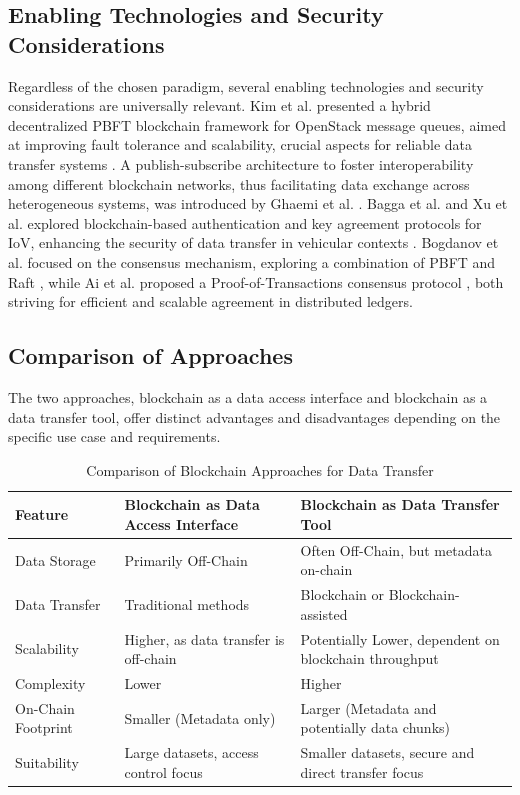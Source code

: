 \documentclass[10pt]{llncs}
\begin{document}
\subsection{Enabling Technologies and Security Considerations}

Regardless of the chosen paradigm, several enabling technologies and security considerations are universally relevant. 
Kim et al. presented a hybrid decentralized PBFT blockchain framework for OpenStack message queues, aimed at improving fault tolerance and scalability, 
crucial aspects for reliable data transfer systems \cite{kim2020hybrid}. 
A publish-subscribe architecture to foster interoperability among different blockchain networks, thus facilitating data exchange across heterogeneous systems, was introduced by Ghaemi et al. \cite{Ghaemi2021}. 
Bagga et al. and Xu et al. explored blockchain-based authentication and key agreement protocols for IoV, enhancing the security of data transfer in vehicular contexts \cite{Bagga2021,Xu2021}. 
Bogdanov et al. focused on the consensus mechanism, exploring a combination of PBFT and Raft \cite{Bogdanov2024}, while Ai et al. proposed a Proof-of-Transactions consensus protocol \cite{Ai2022}, 
both striving for efficient and scalable agreement in distributed ledgers. 

\subsection{Comparison of Approaches}

The two approaches, blockchain as a data access interface and blockchain as a data transfer tool, offer distinct advantages and disadvantages depending on the specific use case and requirements.

\begin{table}[h!]
\caption{Comparison of Blockchain Approaches for Data Transfer}
\label{tab:comparison}
\begin{tabular}{|p{2.0cm}|p{5.0cm}|p{5.0cm}|}
\hline
Feature & Blockchain as Data Access Interface & Blockchain as Data Transfer Tool \\ \hline
Data Storage & Primarily Off-Chain & Often Off-Chain, but metadata on-chain \\ \hline
Data Transfer & Traditional methods & Blockchain or Blockchain-assisted \\ \hline
Scalability & Higher, as data transfer is off-chain & Potentially Lower, dependent on blockchain throughput \\ \hline
Complexity & Lower & Higher \\ \hline
On-Chain Footprint & Smaller (Metadata only) & Larger (Metadata and potentially data chunks) \\ \hline
Suitability & Large datasets, access control focus & Smaller datasets, secure and direct transfer focus \\ \hline
\end{tabular}

\end{table}
\end{document}

